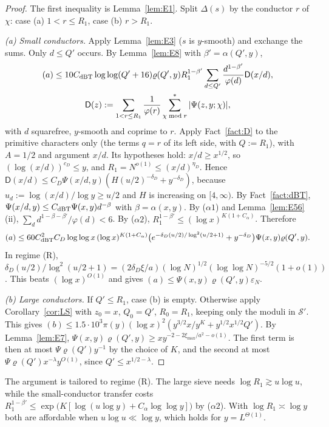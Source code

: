 \documentclass[11pt]{amsart}
\theoremstyle{definition}
\newcommand{\cS}{\mathcal{S}}
\begin{document}
\begin{proof}
The first inequality is Lemma~\ref{lem:E1}. Split $\Delta(s)$ by the conductor $r$ of $\chi$: case (a) $1<r\le R_1$, case (b) $r>R_1$.

\emph{(a) Small conductors.} Apply Lemma~\ref{lem:E3} ($s$ is $y$-smooth) and exchange the sums. Only $d\le Q'$ occurs. By Lemma~\ref{lem:E8} with $\beta'=\alpha(Q',y)$,
\begin{gather*}
(a)\le10C_{\rm dBT}\log\log(Q'+16)\varrho(Q',y)R_1^{1-\beta'}\sum_{d\le Q'}\frac{d^{1-\beta'}}{\varphi(d)}\mathsf D(x/d),\\
\mathsf D(z):=\sum_{1<r\le R_1}\frac1{\varphi(r)}\sum^*_{\chi\bmod r}|\Psi(z,y;\chi)|,
\end{gather*}
with $d$ squarefree, $y$-smooth and coprime to $r$. Apply Fact~\ref{fact:D} to the primitive characters only (the terms $q=r$ of its left
side, with $Q:=R_1$), with $A=1/2$ and argument $x/d$. Its hypotheses hold: $x/d\ge x^{1/2}$, so $(\log(x/d))^{c_D}\le y$, and
$R_1=N^{o(1)}\le(x/d)^{\eta_D}$. Hence $\mathsf D(x/d)\le C_D\Psi(x/d,y)(H(u/2)^{-\delta_D}+y^{-\delta_D})$, because $u_d:=\log(x/d)/\log y\ge u/2$ and $H$ is
increasing on $[4,\infty)$. By Fact~\ref{fact:dBT}, $\Psi(x/d,y)\le C_{\rm dBT}\Psi(x,y)d^{-\beta}$ with $\beta=\alpha(x,y)$. By ($\alpha1$) and
Lemma~\ref{lem:E56}(ii), $\sum_dd^{1-\beta-\beta'}/\varphi(d)<6$. By ($\alpha2$), $R_1^{1-\beta'}\le(\log x)^{K(1+C_\alpha)}$. Therefore
\[
(a)\le60C_{\rm dBT}^2C_D\log\log x\,(\log x)^{K(1+C_\alpha)}\bigl(e^{-\delta_D(u/2)/\log^2(u/2+1)}+y^{-\delta_D}\bigr)\Psi(x,y)\varrho(Q',y).
\]
In regime (R), $\delta_D(u/2)/\log^2(u/2+1)=(2\delta_D\xi/a)(\log N)^{1/2}(\log\log N)^{-5/2}(1+o(1))$. This beats $(\log x)^{O(1)}$ and gives
$(a)\le\Psi(x,y)\varrho(Q',y)\varepsilon_N$.

\emph{(b) Large conductors.} If $Q'\le R_1$, case (b) is empty. Otherwise apply Corollary~\ref{cor:LS} with $z_0=x$, $Q_0=Q'$, $R_0=R_1$, keeping only
the moduli in $\cS'$. This gives $(b)\le1.5\cdot10^3\pi(y)(\log x)^2(y^{3/2}x/y^K+y^{1/2}x^{1/2}Q')$. By Lemma~\ref{lem:E7},
$\Psi(x,y)\varrho(Q',y)\ge xy^{-2-2\xi_{\max}/a^2-o(1)}$. The first term is then at most $\Psi\varrho(Q')y^{-1}$ by the choice of $K$, and the second
at most $\Psi\varrho(Q')x^{-\lambda}y^{O(1)}$, since $Q'\le x^{1/2-\lambda}$.
\end{proof}

\noindent The argument is tailored to regime (R). The large sieve needs $\log R_1\gtrsim u\log u$, while the small-conductor transfer
costs $R_1^{1-\beta'}\le\exp\bigl(K[\log(u\log y)+C_\alpha\log\log y]\bigr)$ by ($\alpha2$). With $\log R_1\asymp\log y$ both are affordable when
$u\log u\ll\log y$, which holds for $y=L^{\Theta(1)}$.
\end{document}
